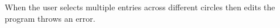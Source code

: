 
\begin{DoxyRefList}
\item[Member \mbox{\hyperlink{imgui__main_8c_ad8eaa9ee2d5dbb3151b1e5397aba8422}{create\+\_\+group\+\_\+box\+\_\+circle}} (int id, Emb\+Circle $\ast$circle)]\label{bug__bug000001}%
%
When the user selects multiple entries across different circles then edits the program throws an error. 
\end{DoxyRefList}